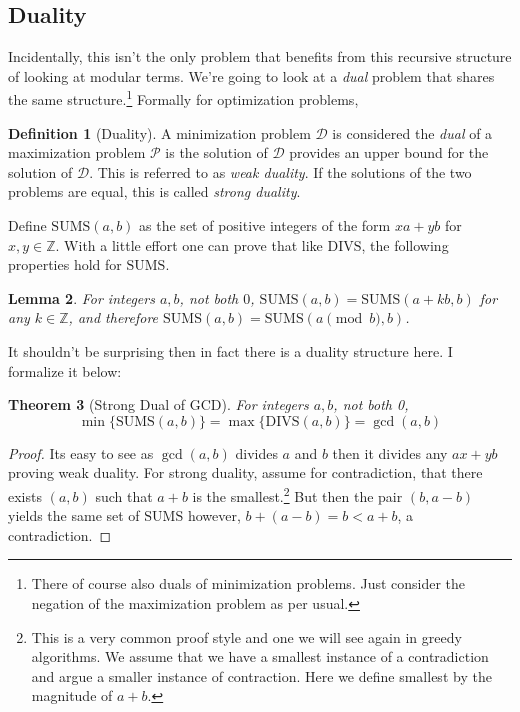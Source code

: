 \documentclass[10pt]{article}
\theoremstyle{plain}
\newtheorem{thm}{Theorem}[section] %
\newtheorem{lem}[thm]{Lemma}
\theoremstyle{definition}
\newtheorem{defn}[thm]{Definition} %
\newcommand{\ZZ}{\mathbb{Z}}
\numberwithin{equation}{section}
\numberwithin{figure}{section}
\begin{document}
\subsection{Duality}

\noindent Incidentally, this isn't the only problem that benefits from this recursive structure of looking at modular terms. We're going to look at a \emph{dual} problem that shares the same structure.\footnote{There of course also duals of minimization problems. Just consider the negation of the maximization problem as per usual.} Formally for optimization problems,

\begin{framed}
\begin{defn}[Duality]
A minimization problem $\mathcal{D}$ is considered the \emph{dual} of a maximization problem $\mathcal{P}$ is the solution of $\mathcal{D}$ provides an upper bound for the solution of $\mathcal{D}$. This is referred to as \emph{weak duality}. If the solutions of the two problems are equal, this is called \emph{strong duality}.
\end{defn}
\end{framed}

\noindent Define $\mathrm{SUMS}(a,b)$ as the set of positive integers of the form $xa + yb$ for $x, y \in \ZZ$. With a little effort one can prove that like $\mathrm{DIVS}$, the following properties hold for $\mathrm{SUMS}$.

\begin{lem}
For integers $a,b$, not both $0$, $\mathrm{SUMS}(a,b) = \mathrm{SUMS}(a + kb, b)$ for any $k \in \ZZ$, and therefore $\mathrm{SUMS}(a,b) = \mathrm{SUMS}(a \pmod b, b)$. 
\end{lem}

\noindent It shouldn't be surprising then in fact there is a duality structure here. I formalize it below:

\begin{thm}[Strong Dual of GCD]
For integers $a, b$, not both 0, 
\begin{equation}
\min \{\mathrm{SUMS}(a,b) \} = \max \{ \mathrm{DIVS}(a,b)\} = \gcd(a,b)
\end{equation}
\end{thm}

\begin{proof}
Its easy to see as $\gcd(a,b)$ divides $a$ and $b$ then it divides any $ax + yb$ proving weak duality. For strong duality, assume for contradiction, that there exists $(a,b)$ such that $a + b$ is the smallest.\footnote{This is a very common proof style and one we will see again in greedy algorithms. We assume that we have a smallest instance of a contradiction and argue a smaller instance of contraction. Here we define smallest by the magnitude of $a + b$.} But then the pair $(b, a - b)$ yields the same set of $\mathrm{SUMS}$ however, $b + (a - b) = b < a + b$, a contradiction.
\end{proof}
\end{document}
